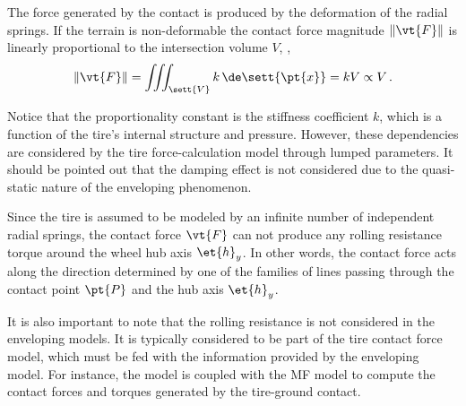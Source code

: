 \begin{observation}
  The force generated by the contact is produced by the deformation of the radial springs. If the terrain is non-deformable the contact force magnitude $\|\vt{F}\|$ is linearly proportional to the intersection volume $V$, \ie{},
  \begin{equation*}
    \| \vt{F} \| = \iiint_\sett{V} k \, \de\sett{\pt{x}} = k V \propto V \, \text{.}
  \end{equation*}
\end{observation}
%
Notice that the proportionality constant is the stiffness coefficient $k$, which is a function of the tire's internal structure and pressure. However, these dependencies are considered by the tire force-calculation model through lumped parameters. It should be pointed out that the damping effect is not considered due to the quasi-static nature of the enveloping phenomenon.
%
\begin{observation}
  Since the tire is assumed to be modeled by an infinite number of independent radial springs, the contact force $\vt{F}$ can not produce any rolling resistance torque around the wheel hub axis $\et{h}_y$. In other words, the contact force acts along the direction determined by one of the families of lines passing through the contact point $\pt{P}$ and the hub axis $\et{h}_y$.
\end{observation}
%
It is also important to note that the rolling resistance is not considered in the enveloping models. It is typically considered to be part of the tire contact force model, which must be fed with the information provided by the enveloping model. For instance, the \Swift{} model is coupled with the \ac{MF} model to compute the contact forces and torques generated by the tire-ground contact.

